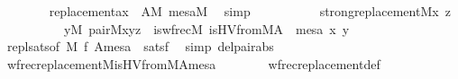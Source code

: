 \begin{isabellebody}
\ \ \ \ \ \ \isamarkupfalse%
\ replacement{\isacharunderscore}{\kern0pt}ax\ {}\ {\isacartoucheopen}A{\isasymin}M{\isacartoucheclose}\ {\isacartoucheopen}mesa{\isasymin}M{\isacartoucheclose}\ \isamarkupfalse%
\ simp\isanewline
\ \ \ \ \isamarkupfalse%
\isanewline
\ \ \ \ \isamarkupfalse%
\ {\isachardoublequoteopen}strong{\isacharunderscore}{\kern0pt}replacement{\isacharparenleft}{\kern0pt}{\isacharhash}{\kern0pt}{\isacharhash}{\kern0pt}M{\isacharcomma}{\kern0pt}{\isasymlambda}x\ z{\isachardot}{\kern0pt}\isanewline
\ \ \ \ \ \ \ \ \ \ {\isasymexists}y{\isasymin}M{\isachardot}{\kern0pt}\ pair{\isacharparenleft}{\kern0pt}{\isacharhash}{\kern0pt}{\isacharhash}{\kern0pt}M{\isacharcomma}{\kern0pt}x{\isacharcomma}{\kern0pt}y{\isacharcomma}{\kern0pt}z{\isacharparenright}{\kern0pt}\ {\isacharampersand}{\kern0pt}\ is{\isacharunderscore}{\kern0pt}wfrec{\isacharparenleft}{\kern0pt}{\isacharhash}{\kern0pt}{\isacharhash}{\kern0pt}M{\isacharcomma}{\kern0pt}\ is{\isacharunderscore}{\kern0pt}HVfrom{\isacharparenleft}{\kern0pt}{\isacharhash}{\kern0pt}{\isacharhash}{\kern0pt}M{\isacharcomma}{\kern0pt}A{\isacharparenright}{\kern0pt}\ {\isacharcomma}{\kern0pt}\ mesa{\isacharcomma}{\kern0pt}\ x{\isacharcomma}{\kern0pt}\ y{\isacharparenright}{\kern0pt}{\isacharparenright}{\kern0pt}{\isachardoublequoteclose}\isanewline
\ \ \ \ \ \ \isamarkupfalse%
\ repl{\isacharunderscore}{\kern0pt}sats{\isacharbrackleft}{\kern0pt}of\ M\ {\isacharquery}{\kern0pt}f\ {\isachardoublequoteopen}{\isacharbrackleft}{\kern0pt}A{\isacharcomma}{\kern0pt}mesa{\isacharbrackright}{\kern0pt}{\isachardoublequoteclose}{\isacharbrackright}{\kern0pt}\ \ satsf\ \isamarkupfalse%
\ {\isacharparenleft}{\kern0pt}simp\ del{\isacharcolon}{\kern0pt}pair{\isacharunderscore}{\kern0pt}abs{\isacharparenright}{\kern0pt}\isanewline
\ \ \ \ \isamarkupfalse%
\isanewline
\ \ \ \ \isamarkupfalse%
\ {\isachardoublequoteopen}wfrec{\isacharunderscore}{\kern0pt}replacement{\isacharparenleft}{\kern0pt}{\isacharhash}{\kern0pt}{\isacharhash}{\kern0pt}M{\isacharcomma}{\kern0pt}is{\isacharunderscore}{\kern0pt}HVfrom{\isacharparenleft}{\kern0pt}{\isacharhash}{\kern0pt}{\isacharhash}{\kern0pt}M{\isacharcomma}{\kern0pt}A{\isacharparenright}{\kern0pt}{\isacharcomma}{\kern0pt}mesa{\isacharparenright}{\kern0pt}{\isachardoublequoteclose}\isanewline
\ \ \ \ \ \ \isamarkupfalse%
\ wfrec{\isacharunderscore}{\kern0pt}replacement{\isacharunderscore}{\kern0pt}def\ \ \isamarkupfalse%

\end{isabellebody}
